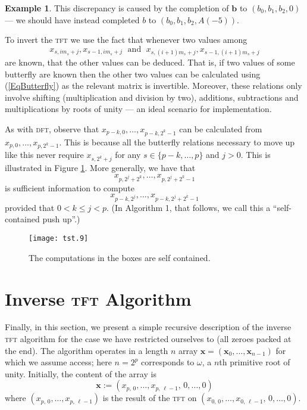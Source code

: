 \documentclass[12pt]{article}
\theoremstyle{definition}
\newcommand{\brac}[1]{\left( #1 \right)}
\newcommand{\xx}{\boldsymbol{x}}
\newcommand{\0}{\mathbf{0}}
\theoremstyle{theorem}
\theoremstyle{definition}
\newtheorem*{example}{Example}
\begin{document}
\begin{example}
This discrepancy is caused by the completion of $\mathbf{b}$ to $(b_0, b_1, b_2, 0)$ --- we should have instead completed $b$ to $(b_0, b_1, b_2,  A(-5) )$.\end{example}

To invert the \textsc{tft} we 
use the fact that whenever two values among $$x_{s,im_s+j}, x_{s-1,im_s+j} \;\text{ and }\; x_{s,(i+1)m_s+j},x_{s-1,(i+1)m_s+j}$$ are known, that the other values can be deduced. That is, if two values of some butterfly are known then the other two values can be calculated using (\ref{EqButterfly}) as the relevant matrix is invertible. Moreover, these relations only involve shifting (multiplication and division by two), additions, subtractions and multiplications by roots of unity --- an ideal scenario for implementation.

As with \textsc{dft}, observe that $x_{p-k,0}, \ldots, x_{p-k,2^k-1}$ can be calculated from $x_{p,0}, \ldots, x_{p,2^k-1}$. This is because all the butterfly relations necessary to move up like this never require $x_{s,2^k+j}$ for any $s \in \{p-k, \ldots, p\}$ and $j>0$. This is illustrated in Figure \ref{boxes}. More generally, we have that
$$x_{p,2^j+2^k}, \ldots, x_{p,2^j + 2^k -1}$$
is sufficient information to compute
$$x_{p-k,2^j}, \ldots, x_{p-k,2^j +2^k -1 }$$ 
provided that $0<k\leq j < p$. (In Algorithm 1, that follows, we call this a ``self-contained push up''.)\\

\begin{figure}[h]
\begin{center}
\texttt{[image: tst.9]}
\caption{The computations in the boxes are self contained.}
\label{boxes}
\end{center}
\end{figure}

\section{Inverse \textsc{tft} Algorithm}\label{Section::AlgTFT}

Finally, in this section, we present a simple recursive description of the inverse \textsc{tft} algorithm for the case we have restricted ourselves to (all zeroes packed at the end). The algorithm operates in a length $n$ array $\xx = \brac{\xx_0, \ldots, \xx_{n-1}}$ for which we assume access; here $n=2^p$ corresponds to $\omega$, a $n$th primitive root of unity. Initially, the content of the array is
$$\xx := \brac{x_{p,\,0}, \ldots, x_{p,\,\ell-1},\, 0, \ldots,0}$$
where $\brac{x_{p,\,0}, \ldots, x_{p,\,\ell-1}}$ is the result of the \textsc{tft} on $\brac{x_{0,\,0}, \ldots, x_{0,\,\ell-1},\,0,\ldots,0}$.
\end{document}
